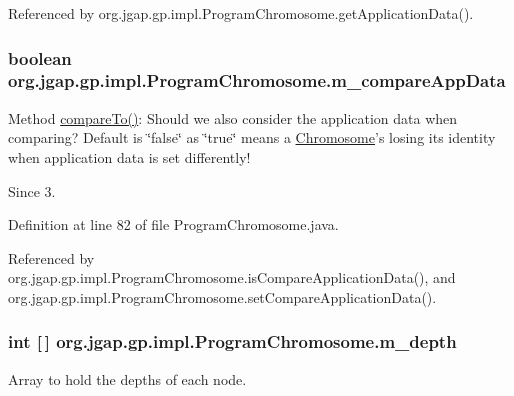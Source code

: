 Referenced by org.\-jgap.\-gp.\-impl.\-Program\-Chromosome.\-get\-Application\-Data().

\hypertarget{classorg_1_1jgap_1_1gp_1_1impl_1_1_program_chromosome_ad4256d733bf0188c9530d7826f1320d3}{
\subsubsection[{m\-\_\-compare\-App\-Data}]{\setlength{\rightskip}{0pt plus 5cm}boolean org.\-jgap.\-gp.\-impl.\-Program\-Chromosome.\-m\-\_\-compare\-App\-Data\hspace{0.3cm}{\ttfamily [private]}}}\label{classorg_1_1jgap_1_1gp_1_1impl_1_1_program_chromosome_ad4256d733bf0188c9530d7826f1320d3}
Method \hyperlink{classorg_1_1jgap_1_1gp_1_1impl_1_1_program_chromosome_ac9896e142c28c71711133698041fb72f}{compare\-To()}\-: Should we also consider the application data when comparing? Default is \char`\"{}false\char`\"{} as \char`\"{}true\char`\"{} means a \hyperlink{classorg_1_1jgap_1_1_chromosome}{Chromosome}'s losing its identity when application data is set differently!

\begin{DoxySince}{Since}
3. 
\end{DoxySince}


Definition at line 82 of file Program\-Chromosome.\-java.



Referenced by org.\-jgap.\-gp.\-impl.\-Program\-Chromosome.\-is\-Compare\-Application\-Data(), and org.\-jgap.\-gp.\-impl.\-Program\-Chromosome.\-set\-Compare\-Application\-Data().

\hypertarget{classorg_1_1jgap_1_1gp_1_1impl_1_1_program_chromosome_a81e14f6750b10a0331646f6b1891f023}{
\subsubsection[{m\-\_\-depth}]{\setlength{\rightskip}{0pt plus 5cm}int \mbox{[}$\,$\mbox{]} org.\-jgap.\-gp.\-impl.\-Program\-Chromosome.\-m\-\_\-depth\hspace{0.3cm}{\ttfamily [private]}}}\label{classorg_1_1jgap_1_1gp_1_1impl_1_1_program_chromosome_a81e14f6750b10a0331646f6b1891f023}
Array to hold the depths of each node. 

